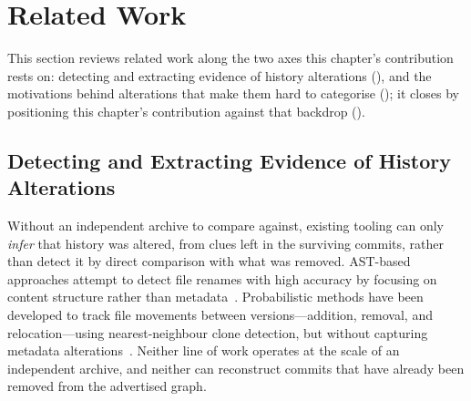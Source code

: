 \section{Related Work}
\label{sec:hist-related}

This section reviews related work along the two axes this chapter's contribution rests on: detecting and extracting evidence of history alterations (), and the motivations behind alterations that make them hard to categorise (); it closes by positioning this chapter's contribution against that backdrop ().

\subsection{Detecting and Extracting Evidence of History Alterations}
\label{subsec:hist-rw-forensics}

Without an independent archive to compare against, existing tooling can only \emph{infer} that history was altered, from clues left in the surviving commits, rather than detect it by direct comparison with what was removed.
AST-based approaches attempt to detect file renames with high accuracy by focusing on content structure rather than metadata~\cite{DBLP:conf/apsec/FujimotoHK21}.
Probabilistic methods have been developed to track file movements between versions---addition, removal, and relocation---using nearest-neighbour clone detection, but without capturing metadata alterations~\cite{DBLP:conf/wcre/LavoieKMZ12}.
Neither line of work operates at the scale of an independent archive, and neither can reconstruct commits that have already been removed from the advertised graph.

